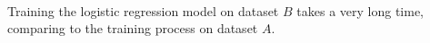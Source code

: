 \begin{answer}
	\\
	Training the logistic regression model on dataset $B$ takes a very long time, comparing to the training process on dataset $A$.
\end{answer}
